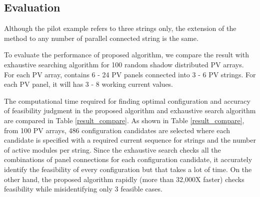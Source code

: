 \documentclass[conference]{pvsctran}
\begin{document}
\subsection{Evaluation}
Although the pilot example refers to three strings only, the extension of the method to any number of parallel connected string is the same.

To evaluate the performance of proposed algorithm, we compare the result with exhaustive searching algorithm for 100 random shadow distributed PV arrays. For each PV array, contains 6 - 24 PV panels connected into 3 - 6 PV strings. For each PV panel, it will has 3 - 8 working current values.

The computational time required for finding optimal configuration and accuracy of feasibility judgment in the proposed algorithm and exhaustive search algorithm are compared in Table \ref{result_compare}. As shown in Table \ref{result_compare},
from 100 PV arrays, 486 configuration candidates are selected where each candidate is specified with a required current sequence for strings and the number of active modules per string.
Since the exhaustive search checks all the combinations of panel connections for each configuration candidate, it accurately identify the feasibility of every configuration but that takes a lot of time.
On the other hand, the proposed algorithm rapidly (more than 32,000X faster) checks feasibility while misidentifying only 3 feasible cases. 
\end{document}

